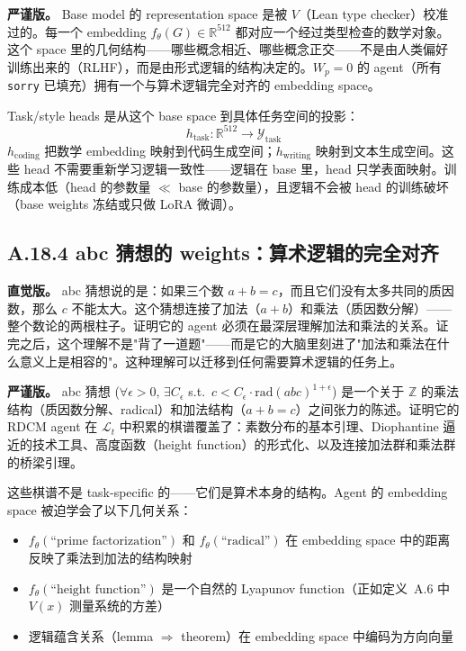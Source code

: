 \documentclass[11pt,a4paper]{article}
\theoremstyle{definition}
\theoremstyle{remark}
\begin{document}
\textbf{严谨版。}
Base model 的 representation space 是被 $V$（Lean type checker）校准过的。每一个 embedding $f_\theta(G) \in \mathbb{R}^{512}$ 都对应一个经过类型检查的数学对象。这个 space 里的几何结构——哪些概念相近、哪些概念正交——不是由人类偏好训练出来的（RLHF），而是由形式逻辑的结构决定的。$W_p = 0$ 的 agent（所有 \texttt{sorry} 已填充）拥有一个与算术逻辑完全对齐的 embedding space。

Task/style heads 是从这个 base space 到具体任务空间的投影：
\[
  h_{\mathrm{task}}: \mathbb{R}^{512} \to \mathcal{Y}_{\mathrm{task}}
\]
$h_{\mathrm{coding}}$ 把数学 embedding 映射到代码生成空间；$h_{\mathrm{writing}}$ 映射到文本生成空间。这些 head 不需要重新学习逻辑一致性——逻辑在 base 里，head 只学表面映射。训练成本低（head 的参数量 $\ll$ base 的参数量），且逻辑不会被 head 的训练破坏（base weights 冻结或只做 LoRA 微调）。


\subsection{A.18.4 abc 猜想的 weights：算术逻辑的完全对齐}

\textbf{直觉版。}
abc 猜想说的是：如果三个数 $a + b = c$，而且它们没有太多共同的质因数，那么 $c$ 不能太大。这个猜想连接了加法（$a + b$）和乘法（质因数分解）——整个数论的两根柱子。证明它的 agent 必须在最深层理解加法和乘法的关系。证完之后，这个理解不是"背了一道题"——而是它的大脑里刻进了"加法和乘法在什么意义上是相容的"。这种理解可以迁移到任何需要算术逻辑的任务上。

\textbf{严谨版。}
abc 猜想 ($\forall \epsilon > 0,\, \exists C_\epsilon$ s.t.\ $c < C_\epsilon \cdot \mathrm{rad}(abc)^{1+\epsilon}$) 是一个关于 $\mathbb{Z}$ 的乘法结构（质因数分解、radical）和加法结构（$a + b = c$）之间张力的陈述。证明它的 RDCM agent 在 $\mathcal{L}_t$ 中积累的棋谱覆盖了：素数分布的基本引理、Diophantine 逼近的技术工具、高度函数（height function）的形式化、以及连接加法群和乘法群的桥梁引理。

这些棋谱不是 task-specific 的——它们是算术本身的结构。Agent 的 embedding space 被迫学会了以下几何关系：
\begin{itemize}[nosep]
  \item $f_\theta(\text{``prime factorization''})$ 和 $f_\theta(\text{``radical''})$ 在 embedding space 中的距离反映了乘法到加法的结构映射
  \item $f_\theta(\text{``height function''})$ 是一个自然的 Lyapunov function（正如定义~A.6 中 $V(x)$ 测量系统的方差）
  \item 逻辑蕴含关系（lemma $\Rightarrow$ theorem）在 embedding space 中编码为方向向量
\end{itemize}
\end{document}
